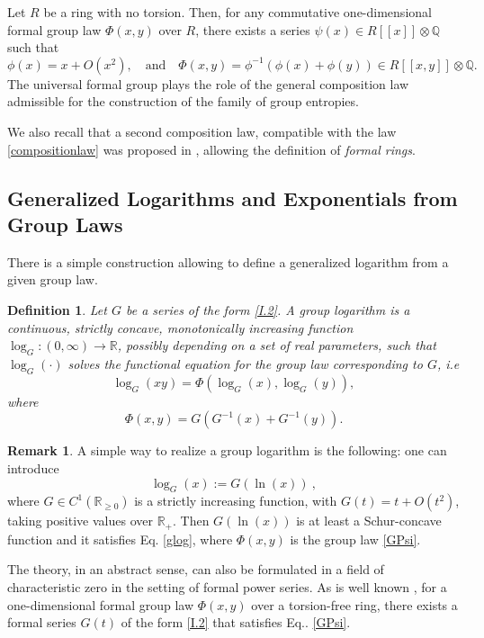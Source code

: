 \documentclass[10pt]{amsart}
\newcommand{\beq}{\begin{equation}}
\newcommand{\eeq}{\end{equation}}
\newtheorem{definition}{Definition}
\newtheorem{theorem}{Theorem}
\theoremstyle{definition}
\newtheorem{remark}{\textbf{Remark}}
\theoremstyle{definition}	 %
\begin{document}
Let $R$ be a ring with no torsion. Then, for any commutative one-dimensional formal group law $\Phi(x,y)$ over $R$, there exists a series $\psi(x)\in R[[x]] \otimes \mathbb{Q}$ such that
\[
\phi(x)= x+ O(x^2), \quad \text{and} \quad \Phi(x,y)= \phi^{-1}\left(\phi(x)+\phi(y)\right)\in R[[x,y]]\otimes \mathbb{Q}.
\]
%
The universal formal group plays the role of the general composition law admissible for the construction of the family of group entropies.

We also recall that a second composition law, compatible with the law \eqref{compositionlaw} was proposed in \cite{CT2019prep}, allowing the definition of \textit{formal rings}.





\subsection{Generalized Logarithms and Exponentials from Group Laws}
There is a simple construction allowing to define a generalized logarithm from a given group law.
\begin{definition} \label{defglog}
Let $G$ be a series of the form \eqref{I.2}. A group logarithm is a continuous, strictly concave, monotonically increasing function $\log_{G}: (0,\infty)\to \mathbb{R}$, possibly depending on a set of real parameters, such that $\log_{G}(\cdot)$ solves the functional equation for the group law corresponding to $G$, i.e
\beq
\log_{G}(xy)= \Phi(\log_{G}(x),\log_{G}(y)), \label{glog}
\eeq
where
\beq
\Phi(x,y)=G(G^{-1}(x)+G^{-1}(y)). \label{GPsi}
\eeq
\end{definition}


\begin{remark}
A simple way to realize a group logarithm is the following: one can introduce
\begin{equation} \label{Glog}
\log_{G}(x):=G(\ln (x)) \ ,
\end{equation}
where $G\in C^{1}(\mathbb{R}_{\geq 0})$ is a strictly increasing function, with  $G(t)=t+O(t^2)$,   taking positive values over $\mathbb{R}_{+}$. Then $G(\ln (x))$  is at least a Schur-concave function and it satisfies  Eq. \eqref{glog}, where $\Phi(x,y)$ is the group law \eqref{GPsi}.
\end{remark}


The theory, in an abstract sense, can also be formulated in a field of characteristic zero in the setting of formal power series. As is well known \cite{Haze}, for a one-dimensional formal group law $\Phi(x,y)$ over a  torsion-free ring, there exists a formal series $G(t)$ of the form \eqref{I.2} that satisfies Eq.. \eqref{GPsi}. %
\end{document}

